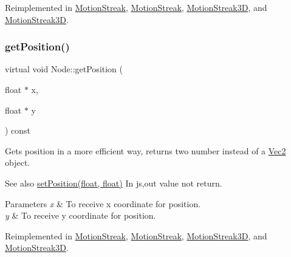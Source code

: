 Reimplemented in \hyperlink{classMotionStreak_a376d2fd83190f87fa86f1aa91ac8f158}{Motion\+Streak}, \hyperlink{classMotionStreak_a979de1d0159b7ebca8c4270aa8d1eece}{Motion\+Streak}, \hyperlink{classMotionStreak3D_aca30ce7817540e8cf038cf11adc58154}{Motion\+Streak3D}, and \hyperlink{classMotionStreak3D_a16c2911514702c9d808d1afad8d0ece3}{Motion\+Streak3D}.

\mbox{\label{classNode_ad48898f3e8629cf9f7da78b0ae0c68ae}} 
\subsubsection{\texorpdfstring{get\+Position()}{getPosition()}\hspace{0.1cm}{\footnotesize\ttfamily [4/4]}}
{\footnotesize\ttfamily virtual void Node\+::get\+Position (\begin{DoxyParamCaption}\item[{float $\ast$}]{x,  }\item[{float $\ast$}]{y }\end{DoxyParamCaption}) const\hspace{0.3cm}{\ttfamily [virtual]}}

Gets position in a more efficient way, returns two number instead of a \hyperlink{classVec2}{Vec2} object.

\begin{DoxySeeAlso}{See also}
{\ttfamily \hyperlink{classNode_aaa8545c103ef1b35e5076dbedab93af5}{set\+Position(float, float)}} In js,out value not return.
\end{DoxySeeAlso}

\begin{DoxyParams}{Parameters}
{\em x} & To receive x coordinate for position. \\
\hline
{\em y} & To receive y coordinate for position. \\
\hline
\end{DoxyParams}


Reimplemented in \hyperlink{classMotionStreak_a376d2fd83190f87fa86f1aa91ac8f158}{Motion\+Streak}, \hyperlink{classMotionStreak_a979de1d0159b7ebca8c4270aa8d1eece}{Motion\+Streak}, \hyperlink{classMotionStreak3D_aca30ce7817540e8cf038cf11adc58154}{Motion\+Streak3D}, and \hyperlink{classMotionStreak3D_a16c2911514702c9d808d1afad8d0ece3}{Motion\+Streak3D}.

\mbox{\label{classNode_a8617dd2eb9af75a66ebaff0d3c99285e}} 
